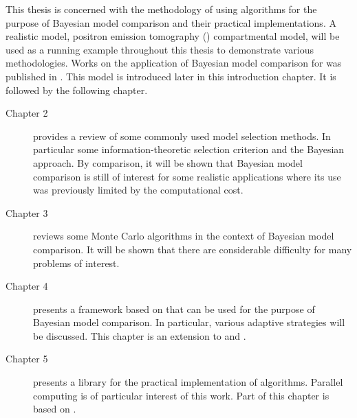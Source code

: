 This thesis is concerned with the methodology of using \smc algorithms for the
purpose of Bayesian model comparison and their practical implementations. A
realistic model, positron emission tomography (\pet) compartmental model, will
be used as a running example throughout this thesis to demonstrate various
methodologies. Works on the application of Bayesian model comparison for \pet
was published in \cite{Zhou2013}. This model is introduced later in this
introduction chapter. It is followed by the following chapter.
\begin{description}
  \item[Chapter 2] provides a review of some commonly used model selection
    methods. In particular some information-theoretic selection criterion and
    the Bayesian approach. By comparison, it will be shown that Bayesian model
    comparison is still of interest for some realistic applications where its
    use was previously limited by the computational cost.
  \item[Chapter 3] reviews some Monte Carlo algorithms in the context of
    Bayesian model comparison. It will be shown that there are considerable
    difficulty for many problems of interest.
  \item[Chapter 4] presents a framework based on \smc that can be used for the
    purpose of Bayesian model comparison. In particular, various adaptive
    strategies will be discussed. This chapter is an extension to
    \cite{Zhou:2012uz} and \cite{Zhou:2013vx}.
  \item[Chapter 5] presents a \cpp library for the practical implementation of
    \smc algorithms. Parallel computing is of particular interest of this
    work. Part of this chapter is based on \cite{vsmcjss}.
\end{description}
